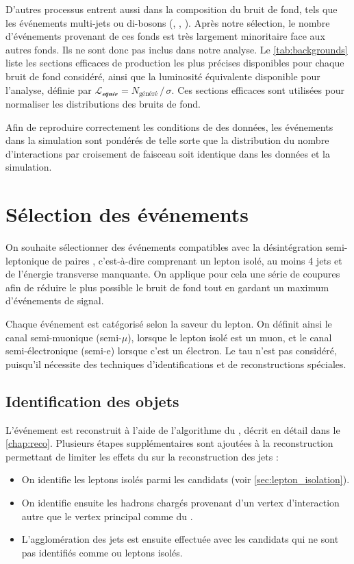 D'autres processus entrent aussi dans la composition du bruit de fond, tels que les événements multi-jets ou di-bosons (\PW{}\PW, \PZ{}\PZ, \PW{}\PZ). Après notre sélection, le nombre d'événements provenant de ces fonds est très largement minoritaire face aux autres fonds. Ils ne sont donc pas inclus dans notre analyse. Le \cref{tab:backgrounds} liste les sections efficaces de production les plus précises disponibles pour chaque bruit de fond considéré, ainsi que la luminosité équivalente disponible pour l'analyse, définie par $\mathcal{L_\text{equiv}} = N_\text{généré} \, / \, \sigma$. Ces sections efficaces sont utilisées pour normaliser les distributions des bruits de fond.

\bigskip

Afin de reproduire correctement les conditions de \pu des données, les événements dans la simulation sont pondérés de telle sorte que la distribution du nombre d'interactions par croisement de faisceau soit identique dans les données et la simulation.

\section{Sélection des événements} \label{sec:zprime_sel}

On souhaite sélectionner des événements compatibles avec la désintégration semi-leptonique de paires \ttbar, c'est-à-dire comprenant un lepton isolé, au moins 4 jets et de l'énergie transverse manquante. On applique pour cela une série de coupures afin de réduire le plus possible le bruit de fond tout en gardant un maximum d'événements de signal.

\medskip

Chaque événement est catégorisé selon la saveur du lepton. On définit ainsi le canal semi-muonique (semi-$\mu$), lorsque le lepton isolé est un muon, et le canal semi-électronique (semi-e) lorsque c'est un électron. Le tau n'est pas considéré, puisqu'il nécessite des techniques d'identifications et de reconstructions spéciales.

\subsection{Identification des objets}

L'événement est reconstruit à l'aide de l'algorithme du \pf, décrit en détail dans le \cref{chap:reco}. Plusieurs étapes supplémentaires sont ajoutées à la reconstruction permettant de limiter les effets du \pu sur la reconstruction des jets :
\begin{itemize}
    \item On identifie les leptons isolés parmi les candidats \pf (voir \cref{sec:lepton_isolation}).
    \item On identifie ensuite les hadrons chargés provenant d'un vertex d'interaction autre que le vertex principal comme du \pu.
    \item L'agglomération des jets est ensuite effectuée avec les candidats \pf qui ne sont pas identifiés comme \pu ou leptons isolés.
\end{itemize}

